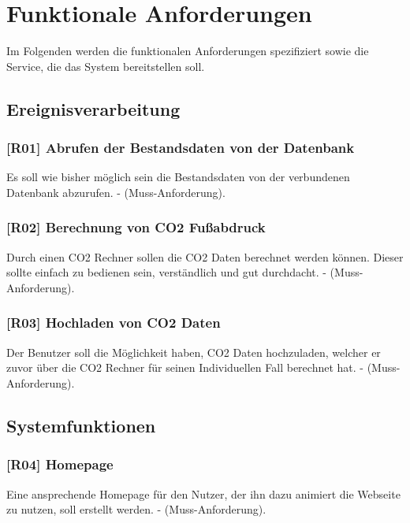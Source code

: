 \section{Funktionale Anforderungen}
\label{chapter:3-section:funktionale-anforderungen}

Im Folgenden werden die funktionalen Anforderungen spezifiziert sowie die Service, die das System bereitstellen soll.

\subsection{Ereignisverarbeitung}

\subsubsection{[R01] Abrufen der Bestandsdaten von der Datenbank}

Es soll wie bisher möglich sein die Bestandsdaten von der verbundenen Datenbank abzurufen. - (Muss-Anforderung).

\subsubsection{[R02] Berechnung von CO2 Fußabdruck}

Durch einen CO2 Rechner sollen die CO2 Daten berechnet werden können. Dieser sollte einfach zu bedienen sein, verständlich und gut durchdacht. - (Muss-Anforderung).

\subsubsection{[R03] Hochladen von CO2 Daten}

Der Benutzer soll die Möglichkeit haben, CO2 Daten hochzuladen, welcher er zuvor über die CO2 Rechner für seinen Individuellen Fall berechnet hat. - (Muss-Anforderung).

\subsection{Systemfunktionen}

\subsubsection{[R04] Homepage}

Eine ansprechende Homepage für den Nutzer, der ihn dazu animiert die Webseite zu nutzen, soll erstellt werden. - (Muss-Anforderung).

